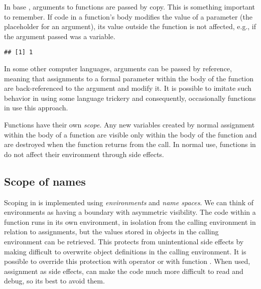 \documentclass[krantz2]{krantz}\usepackage{knitr}
\begin{document}
In base \Rlang, arguments to functions are passed by copy. This is something important to remember. If code in a function's body modifies the value of a parameter (the placeholder for an argument), its value outside the function is not affected, e.g., if the argument passed was a variable.

\begin{knitrout}\footnotesize
{}\color{fgcolor}\begin{kframe}
\begin{alltt}
 \hlkwb{<-} \hlstd{(} \hlkwb{<-} \hlstd{\}}
 \hlkwb{<-} 
\end{alltt}
\begin{verbatim}
## [1] 1
\end{verbatim}
\end{kframe}
\end{knitrout}

\begin{warningbox}
In some other computer languages, arguments can be passed by reference, meaning that assignments to a formal parameter within the body of the function are back-referenced to the argument and modify it. It is possible to imitate such behavior in \Rlang using some language trickery and consequently, occasionally functions in \Rlang use this approach.
\end{warningbox}

Functions have their own \emph{scope}. Any new variables created by normal assignment within the body of a function are visible only within the body of the function and are destroyed when the function returns from the call. In normal use, functions in \Rlang do not affect their environment through side effects.

\subsection{Scope of names}
Scoping in \Rlang is implemented using \emph{environments} and \emph{name spaces}. We can think of environments as having a boundary with asymmetric visibility. The code within a function runs in its own environment, in isolation from the calling environment in relation to assignments, but the values stored in objects in the calling environment can be retrieved. This protects from unintentional side effects by making difficult to overwrite object definitions in the calling environment. It is possible to override this protection with operator \Roperator{<<-} or with function . When used, assignment as side effects, can make the code much more difficult to read and debug, so its best to avoid them.
\end{document}
